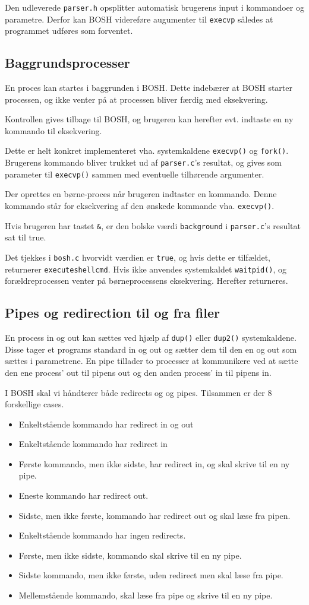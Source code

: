 Den udleverede \verb+parser.h+ opsplitter automatisk brugerens input i kommandoer og parametre. Derfor kan BOSH videreføre augumenter til \verb+execvp+ således at programmet udføres som forventet.
\subsection{Baggrundsprocesser}
En proces kan startes i baggrunden i BOSH. Dette indebærer at BOSH starter processen, og ikke venter på at processen bliver færdig med eksekvering. 

Kontrollen gives tilbage til BOSH, og brugeren kan herefter evt. indtaste en ny kommando til eksekvering. 

Dette er helt konkret implementeret vha. systemkaldene \verb+execvp()+ og \verb+fork()+. Brugerens kommando bliver trukket ud af \verb+parser.c+'s resultat, og gives som parameter til \verb+execvp()+ sammen med eventuelle tilhørende argumenter. 

Der oprettes en børne-proces når brugeren indtaster en kommando. Denne kommando står for eksekvering af den ønskede kommande vha. \verb+execvp()+. 

Hvis brugeren har tastet \verb+&+, er den bolske værdi \verb+background+ i \verb+parser.c+'s resultat sat til true. 

Det tjekkes i \verb+bosh.c+ hvorvidt værdien er \verb+true+, og hvis dette er tilfældet, returnerer \verb+executeshellcmd+. Hvis ikke anvendes systemkaldet \verb+waitpid()+, og forældreprocessen venter på børneprocessens eksekvering. Herefter returneres.
\subsection{Pipes og redirection til og fra filer}
En process in og out kan sættes ved hjælp af \verb+dup()+ eller \verb+dup2()+ systemkaldene. Disse tager et programs standard in og out og sætter dem til den en og out som sættes i parametrene. En pipe tillader to processer at kommunikere ved at sætte den ene process' out til pipens out og den anden process' in til pipens in.

I BOSH skal vi håndterer både redirects og og pipes. Tilsammen er der 8 forskellige cases.
\begin{itemize}
	\item Enkeltstående kommando har redirect in og out
	\item Enkeltstående kommando har redirect in
	\item Første kommando, men ikke sidste, har redirect in, og skal skrive til en ny pipe.
	\item Eneste kommando har redirect out.
	\item Sidste, men ikke første, kommando har redirect out og skal læse fra pipen.
	\item Enkeltstående kommando har ingen redirects.
	\item Første, men ikke sidste, kommando skal skrive til en ny pipe.
	\item Sidste kommando, men ikke første, uden redirect men skal læse fra pipe.
	\item Mellemstående kommando, skal læse fra pipe og skrive til en ny pipe.
\end{itemize}
